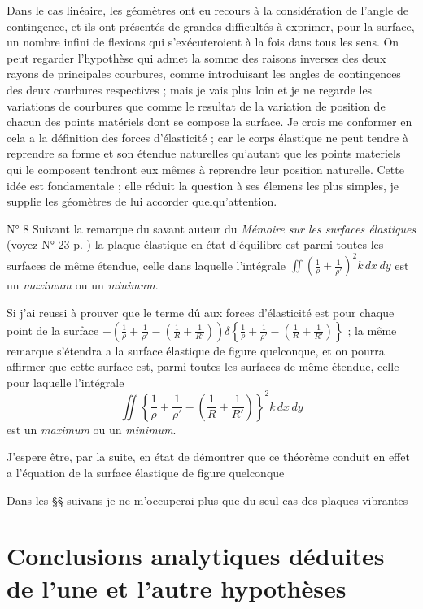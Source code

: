 \documentclass[11pt,a4paper]{article}
\begin{document}
Dans le cas linéaire, les géomètres ont eu recours à la considération de
l'angle de contingence, et ils ont présentés de grandes difficultés à
exprimer, pour la surface, un nombre infini de flexions qui s'exécuteroient à
la fois dans tous les sens. On peut regarder l'hypothèse qui admet la somme
des raisons inverses des deux rayons de principales courbures, comme
introduisant les angles de contingences des deux courbures respectives ; mais
je vais plus loin et je ne regarde les variations de courbures que comme le
resultat de la variation de position de chacun des points matériels dont se
compose la surface. Je crois me conformer en cela a la définition des forces
d'élasticité ; car le corps élastique ne peut tendre à reprendre sa forme et
son étendue naturelles qu'autant que les points materiels qui le composent
tendront eux mêmes à reprendre leur position naturelle. Cette idée est
fondamentale ; elle réduit la question à ses élemens les plus simples, je
supplie les géomètres de lui accorder quelqu'attention.

N° 8 Suivant la remarque du savant auteur du \emph{Mémoire sur les surfaces
élastiques} (voyez N° 23 p. ) la plaque élastique en état
d'équilibre est parmi toutes les surfaces de même étendue, celle dans laquelle
l'intégrale
$\iint \left( \frac{1}{\rho} + \frac{1}{\rho'} \right)^{2} k\, dx\, dy$
est un \emph{maximum} ou un \emph{minimum}.

Si j'ai reussi à prouver que le terme dû aux forces d'élasticité est pour
chaque point de la surface
$-\left( \frac{1}{\rho} + \frac{1}{\rho'} - \left( \frac{1}{R} + \frac{1}{R'} \right) \right)
 \delta\left\{ \frac{1}{\rho} + \frac{1}{\rho'} - \left( \frac{1}{R} + \frac{1}{R'} \right) \right\}$ ;
la même remarque s'étendra a la surface élastique de figure quelconque, et on
pourra affirmer que cette surface est, parmi toutes les surfaces de même
étendue, celle pour laquelle l'intégrale
\[
  \iint \left\{ \frac{1}{\rho} + \frac{1}{\rho'}
        - \left( \frac{1}{R} + \frac{1}{R'} \right) \right\}^{2} k\, dx\, dy
\]
est un \emph{maximum} ou un \emph{minimum}.

J'espere être, par la suite, en état de démontrer que ce théorème conduit en
effet a l'équation de la surface élastique de figure quelconque

Dans les §§ suivans je ne m'occuperai plus que du seul cas des plaques
vibrantes

\section{Conclusions analytiques déduites de l'une et l'autre hypothèses}
\end{document}
